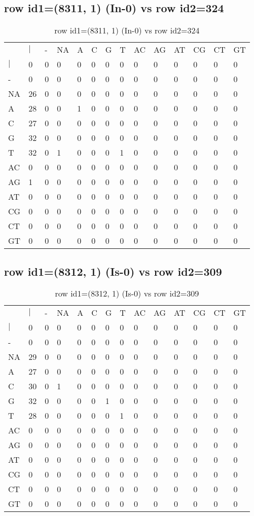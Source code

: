 \subsection{row id1=(8311, 1) (In-0) vs row id2=324}
\begin{center}
\begin{longtable}{|l|l|l|l|l|l|l|l|l|l|l|l|l|l|}
\caption{row id1=(8311, 1) (In-0) vs row id2=324} \label{table_dm302}\\
\hline
\\
\hline
&$|$&-&NA&A&C&G&T&AC&AG&AT&CG&CT&GT\\
$|$&0&0&0&0&0&0&0&0&0&0&0&0&0\\
-&0&0&0&0&0&0&0&0&0&0&0&0&0\\
NA&26&0&0&0&0&0&0&0&0&0&0&0&0\\
A&28&0&0&1&0&0&0&0&0&0&0&0&0\\
C&27&0&0&0&0&0&0&0&0&0&0&0&0\\
G&32&0&0&0&0&0&0&0&0&0&0&0&0\\
T&32&0&1&0&0&0&1&0&0&0&0&0&0\\
AC&0&0&0&0&0&0&0&0&0&0&0&0&0\\
AG&1&0&0&0&0&0&0&0&0&0&0&0&0\\
AT&0&0&0&0&0&0&0&0&0&0&0&0&0\\
CG&0&0&0&0&0&0&0&0&0&0&0&0&0\\
CT&0&0&0&0&0&0&0&0&0&0&0&0&0\\
GT&0&0&0&0&0&0&0&0&0&0&0&0&0\\
\hline
\end{longtable}
\end{center}

\subsection{row id1=(8312, 1) (Is-0) vs row id2=309}
\begin{center}
\begin{longtable}{|l|l|l|l|l|l|l|l|l|l|l|l|l|l|}
\caption{row id1=(8312, 1) (Is-0) vs row id2=309} \label{table_dm304}\\
\hline
\\
\hline
&$|$&-&NA&A&C&G&T&AC&AG&AT&CG&CT&GT\\
$|$&0&0&0&0&0&0&0&0&0&0&0&0&0\\
-&0&0&0&0&0&0&0&0&0&0&0&0&0\\
NA&29&0&0&0&0&0&0&0&0&0&0&0&0\\
A&27&0&0&0&0&0&0&0&0&0&0&0&0\\
C&30&0&1&0&0&0&0&0&0&0&0&0&0\\
G&32&0&0&0&0&1&0&0&0&0&0&0&0\\
T&28&0&0&0&0&0&1&0&0&0&0&0&0\\
AC&0&0&0&0&0&0&0&0&0&0&0&0&0\\
AG&0&0&0&0&0&0&0&0&0&0&0&0&0\\
AT&0&0&0&0&0&0&0&0&0&0&0&0&0\\
CG&0&0&0&0&0&0&0&0&0&0&0&0&0\\
CT&0&0&0&0&0&0&0&0&0&0&0&0&0\\
GT&0&0&0&0&0&0&0&0&0&0&0&0&0\\
\hline
\end{longtable}
\end{center}

